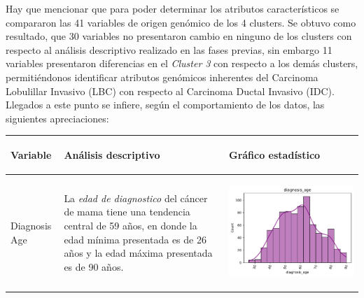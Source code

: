 Hay que mencionar que para poder determinar los atributos característicos se compararon las 41 variables de origen genómico de los 4 clusters. Se obtuvo como resultado, que 30 variables no presentaron cambio en ninguno de los clusters con respecto al análisis descriptivo realizado en las fases previas, sin embargo 11 variables presentaron diferencias en el \textit{Cluster 3} con respecto a los demás clusters, permitiéndonos identificar atributos genómicos inherentes del Carcinoma Lobulillar Invasivo (LBC) con respecto al Carcinoma Ductal Invasivo (IDC). Llegados a este punto se infiere, según el comportamiento de los datos, las siguientes apreciaciones:
\begin{table}[htb!]
	\footnotesize
	\begin{threeparttable}
		\begin{tabular}{p{2.5cm} p{7cm} p{6.5cm}} \toprule
			\begin{center}Variable\end{center}   	 
			&\begin{center}Análisis descriptivo\end{center}             
			&\begin{center}Gráfico estadístico\end{center}\\ \hline
			Diagnosis Age
			& La \textit{edad de diagnostico} del cáncer de mama tiene una tendencia central de 59 años, en donde la edad mínima presentada es de  26 años y la edad máxima presentada es de 90 años.
			& \begin{center}\includegraphics[width=1\linewidth]{NOTEBOOK/IMAGENES_DESCRIPTIVAS/1_diagnosis_age}\end{center}

\end{tabular}
\end{threeparttable}
\end{table}
